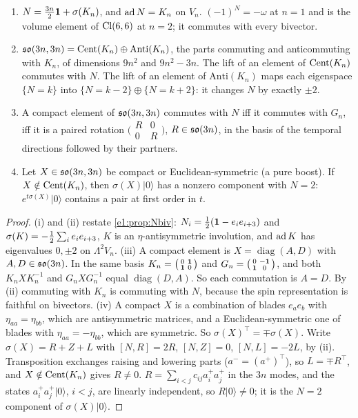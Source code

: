 \begin{lemma}
\label{e2:lem:N}
\begin{enumerate}[label=(\roman*),leftmargin=2.2em]
\item $N=\tfrac{3n}2\mathbf 1+\sigma(K_n)$, and $\operatorname{ad} N=K_n$ on $V_n$. $(-1)^N=-\omega$ at $n=1$ and is the volume element of $\mathrm{Cl}(6,6)$ at $n=2$; it commutes with
every bivector.
\item $\mathfrak{so}(3n,3n)=\operatorname{Cent}(K_n)\oplus\mathrm{Anti}(K_n)$, the parts commuting and anticommuting with $K_n$, of dimensions $9n^2$ and $9n^2-3n$. The lift of an
element of $\operatorname{Cent}(K_n)$ commutes with $N$. The lift of an element of $\mathrm{Anti}(K_n)$ maps each eigenspace $\{N=k\}$ into $\{N=k-2\}\oplus\{N=k+2\}$:
it changes $N$ by exactly $\pm2$.
\item A compact element of $\mathfrak{so}(3n,3n)$ commutes with $N$ iff it commutes with $G_n$, iff it is a paired rotation
$\bigl(\begin{smallmatrix}R&0\\0&R\end{smallmatrix}\bigr)$, $R\in\mathfrak{so}(3n)$, in the basis of the temporal directions followed by their partners.
\item Let $X\in\mathfrak{so}(3n,3n)$ be compact or Euclidean-symmetric (a pure boost). If $X\notin\operatorname{Cent}(K_n)$, then $\sigma(X)|0\rangle$ has a nonzero
component with $N=2$: $e^{t\sigma(X)}|0\rangle$ contains a pair at first order in $t$.
\end{enumerate}
\end{lemma}

\begin{proof}
(i) and (ii) restate \cref{e1:prop:Nbiv}: $N_i=\tfrac12(\mathbf 1-e_ie_{i+3})$ and $\sigma(K)=-\tfrac12\sum_ie_ie_{i+3}$, $K$ is an $\eta$-antisymmetric involution,
and $\operatorname{ad} K$ has eigenvalues $0,\pm2$ on $\Lambda^2V_n$. (iii) A compact element is $X=\operatorname{diag}(A,D)$ with $A,D\in\mathfrak{so}(3n)$. In the same
basis $K_n=\bigl(\begin{smallmatrix}0&\mathbf 1\\\mathbf 1&0\end{smallmatrix}\bigr)$ and $G_n=\bigl(\begin{smallmatrix}0&-\mathbf 1\\\mathbf 1&0\end{smallmatrix}\bigr)$, and
both $K_nXK_n^{-1}$ and $G_nXG_n^{-1}$ equal $\operatorname{diag}(D,A)$. So each commutation is $A=D$. By (ii) commuting with $K_n$ is
commuting with $N$, because the spin representation is faithful on bivectors. (iv) A compact $X$ is a combination of blades $e_ae_b$ with
$\eta_{aa}=\eta_{bb}$, which are antisymmetric matrices, and a Euclidean-symmetric one of blades with $\eta_{aa}=-\eta_{bb}$, which are symmetric. So
$\sigma(X)^{\!\top}=\mp\sigma(X)$. Write $\sigma(X)=R+Z+L$ with $[N,R]=2R$, $[N,Z]=0$, $[N,L]=-2L$, by (ii). Transposition exchanges raising and
lowering parts ($a^-=(a^+)^{\!\top}$), so $L=\mp R^{\!\top}$, and $X\notin\operatorname{Cent}(K_n)$ gives $R\neq0$. $R=\sum_{i<j}c_{ij}a^+_ia^+_j$ in the $3n$ modes,
and the states $a^+_ia^+_j|0\rangle$, $i<j$, are linearly independent, so $R|0\rangle\neq0$; it is the $N=2$ component of $\sigma(X)|0\rangle$.
\end{proof}


